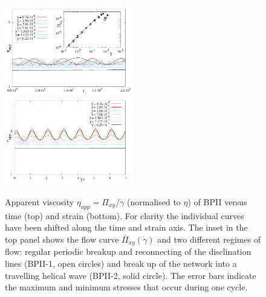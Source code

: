 \documentclass[aps,pre,reprint,superscriptaddress, twocolumn]{revtex4}
\newcommand{\gd}{\dot{\gamma}}
\begin{document}
\begin{figure}[htpb]
\includegraphics[width=0.495\textwidth]{stress_bp2.pdf}
\includegraphics[width=0.495\textwidth]{stress_vs_strain_bp2.pdf}
\caption{Apparent viscosity $\eta_{app}=\Pi_{xy}/\gd$ (normalised to $\eta$) 
of BPII versus time (top) and strain (bottom). 
For clarity the individual curves have been shifted along the time and strain axis. 
The inset in the top panel 
shows the flow curve $\bar{\Pi}_{xy}(\gd)$ and two different regimes of flow: 
regular periodic breakup and reconnecting of the disclination lines (BPII-1, open circles) 
and break up of the network into a travelling helical wave (BPII-2, solid circle).
The error bars indicate the maximum and minimum stresses that occur during one cycle.}
\label{bp2-rheo}
\end{figure}
\end{document}
